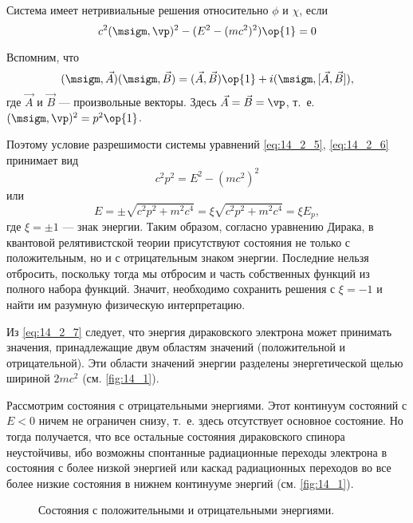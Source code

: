 Система имеет нетривиальные решения относительно $\phi$ и $\chi$, если 
$$
c^2 (\msigm, \vp)^2 - (E^2 - (mc^2)^2)\op{1} = 0
$$

Вспомним, что 
$$
(\msigm, \vec{A})(\msigm, \vec{B}) = (\vec{A}, \vec{B}) \op{1} + i(\msigm, [\vec{A}, \vec{B}]),
$$
где $\vec A$ и $\vec B$ --- произвольные векторы. Здесь $\vec{A} = \vec{B} = \vp$, т.~е. $(\msigm, \vp)^2 = p^2 \op{1}$.

Поэтому условие разрешимости системы уравнений \eqref{eq:14_2_5}, \eqref{eq:14_2_6} принимает вид
$$
c^2 p^2 = E^2 - (mc^2)^2
$$
или
\begin{equation}
\label{eq:14_2_7}
\boxed{E = \pm \sqrt{c^2 p^2 + m^2 c^4} = \xi \sqrt{c^2p^2 + m^2 c^4} = \xi E_p},
\end{equation}
где $\xi = \pm 1$ --- знак энергии. Таким образом, согласно уравнению Дирака, в квантовой релятивистской теории присутствуют состояния не только с положительным, но и с отрицательным знаком энергии. Последние нельзя отбросить, поскольку тогда мы отбросим и часть собственных функций из полного набора функций. Значит, необходимо сохранить решения с $\xi = -1$ и найти им разумную физическую интерпретацию.

Из \eqref{eq:14_2_7} следует, что энергия дираковского электрона может принимать значения, принадлежащие двум областям значений (положительной и отрицательной). Эти области значений энергии разделены энергетической щелью шириной $2mc^2$ (см. \autoref{fig:14_1}).

Рассмотрим состояния с отрицательными энергиями. Этот континуум состояний с $E<0$ ничем не ограничен снизу, т.~е. здесь отсутствует основное состояние. Но тогда получается, что все остальные состояния дираковского спинора неустойчивы, ибо возможны спонтанные радиационные переходы электрона в состояния с более низкой энергией или каскад радиационных переходов во все более низкие состояния в нижнем континууме энергий (см. \autoref{fig:14_1}).

\begin{figure}[h!]
\centering
{}
\caption{Состояния с положительными и отрицательными энергиями.} \label{fig:14_1}
\end{figure}


